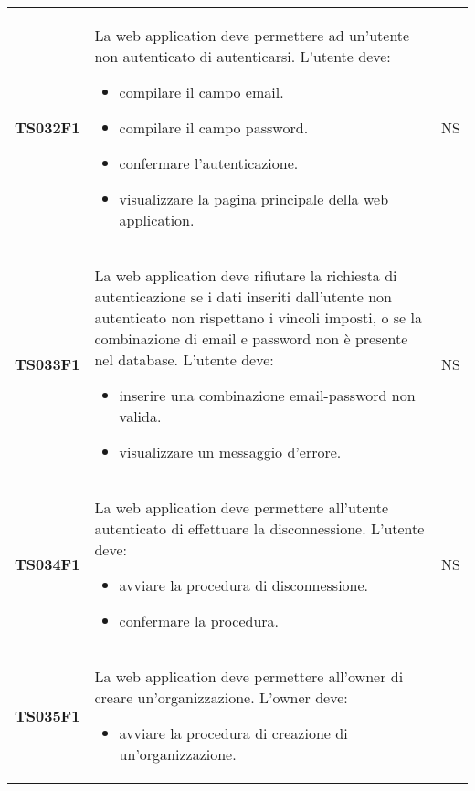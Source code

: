 \documentclass[../piano-di-qualifica.tex]{subfiles}
\begin{document}
\begin{centering}
\begin{longtable}[H]{>{\centering\bfseries}m{3cm} >{}p{10cm} >{\centering\arraybackslash}m{3cm}}
        TS032F1     & La web application deve permettere ad un'utente non autenticato di autenticarsi. \newline
                      L'utente deve:
                      \begin{itemize}
                        \item compilare il campo email.
                        \item compilare il campo password.
                        \item confermare l'autenticazione.
                        \item visualizzare la pagina principale della web application.
                      \end{itemize}
                    & NS \\
        TS033F1     & La web application deve rifiutare la richiesta di autenticazione se i dati inseriti dall'utente non autenticato non rispettano i vincoli imposti, o se la combinazione di email e password non è presente nel database. \newline
                      L'utente deve:
                      \begin{itemize}
                        \item inserire una combinazione email-password non valida.
                        \item visualizzare un messaggio d'errore.
                      \end{itemize}
                    & NS \\
        TS034F1     & La web application deve permettere all'utente autenticato di effettuare la disconnessione. \newline
                      L'utente deve:
                      \begin{itemize}
                        \item avviare la procedura di disconnessione.
                        \item confermare la procedura.
                      \end{itemize}
                    & NS \\
        TS035F1     & La web application deve permettere all'owner di creare un'organizzazione. \newline
                      L'owner deve:
                      \begin{itemize}
                        \item avviare la procedura di creazione di un'organizzazione.

\end{itemize}
\end{longtable}
\end{centering}
\end{document}
